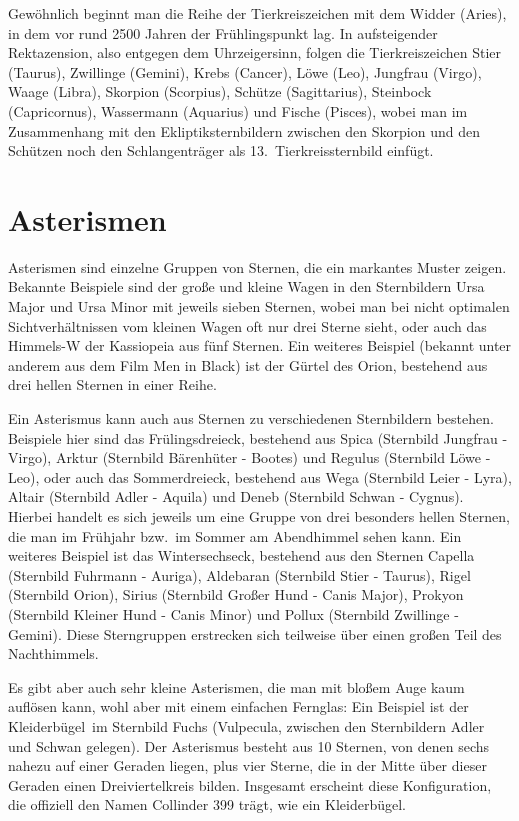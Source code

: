 Gew\"ohnlich beginnt man die Reihe der Tierkreiszeichen mit dem 
Widder (Aries), in dem vor rund 2500 Jahren der 
Fr\"uhlingspunkt lag. In aufsteigender Rektazension, also entgegen dem Uhrzeigersinn, folgen die Tierkreiszeichen
Stier (Taurus), Zwillinge (Gemini), Krebs (Cancer), L\"owe (Leo), Jungfrau (Virgo), Waage (Libra), Skorpion (Scorpius),
Sch\"utze (Sagittarius), Steinbock (Capricornus), Wassermann (Aquarius) und Fische (Pisces), wobei man 
im Zusammenhang mit den Ekliptiksternbildern 
zwischen den Skorpion und den Sch\"utzen noch den Schlangentr\"ager als 13.\ Tierkreissternbild einf\"ugt. 

\section{Asterismen}

Asterismen 
sind einzelne Gruppen von Sternen, die ein markantes Muster zeigen. Bekannte
Beispiele sind der gro\ss e und kleine Wagen in den Sternbildern Ursa Major und Ursa Minor mit jeweils
sieben Sternen, wobei man bei nicht optimalen Sichtverh\"altnissen vom kleinen Wagen oft nur drei
Sterne sieht, oder auch das Himmels-W der Kassiopeia aus f\"unf Sternen. Ein weiteres Beispiel
(bekannt unter anderem aus dem Film \glqq Men in Black\grqq) ist der G\"urtel des Orion, bestehend
aus drei hellen Sternen in einer Reihe. 

Ein Asterismus kann auch aus Sternen zu verschiedenen Sternbildern bestehen. Beispiele
hier sind das Fr\"ulingsdreieck, 
bestehend aus Spica (Sternbild Jungfrau - Virgo), Arktur (Sternbild 
B\"arenh\"uter - Bootes) und Regulus (Sternbild L\"owe - Leo), oder auch das 
Sommerdreieck,
bestehend aus Wega (Sternbild Leier - Lyra), Altair (Sternbild Adler - Aquila) und Deneb (Sternbild Schwan - Cygnus). 
Hierbei handelt es sich jeweils um eine Gruppe von drei besonders hellen Sternen, die man im
Fr\"uhjahr bzw.\ im Sommer am Abendhimmel sehen kann. Ein weiteres Beispiel ist das 
Wintersechseck,
bestehend aus den Sternen Capella (Sternbild Fuhrmann - Auriga), Aldebaran (Sternbild Stier - Taurus), 
Rigel (Sternbild Orion), Sirius (Sternbild Gro\ss er Hund - Canis Major), Prokyon (Sternbild Kleiner Hund -
Canis Minor) und Pollux (Sternbild Zwillinge - Gemini). Diese Sterngruppen erstrecken sich teilweise
\"uber einen gro\ss en Teil des Nachthimmels. 

Es gibt aber auch sehr kleine Asterismen, die man mit blo\ss em Auge kaum aufl\"osen kann, wohl
aber mit einem einfachen Fernglas: Ein Beispiel ist der 
\glqq Kleiderb\"ugel\grqq\ im Sternbild Fuchs (Vulpecula,
zwischen den Sternbildern Adler und Schwan gelegen). Der Asterismus besteht aus 10 Sternen, von denen
sechs nahezu auf einer Geraden liegen, plus vier Sterne, die in der Mitte \"uber dieser Geraden einen
Dreiviertelkreis bilden. Insgesamt erscheint diese Konfiguration, die offiziell den 
Namen Collinder 399 tr\"agt,
wie ein Kleiderb\"ugel.   


